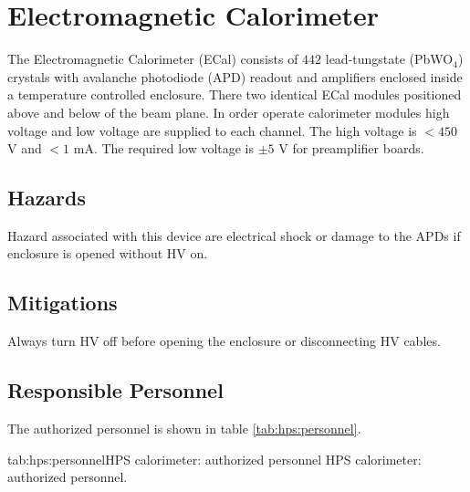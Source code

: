 \section{Electromagnetic Calorimeter}
\indent

The Electromagnetic Calorimeter (ECal) consists of $442$ lead-tungstate (PbWO$_4$) crystals with avalanche photodiode (APD) 
readout and amplifiers enclosed inside a temperature controlled enclosure. There two identical ECal modules positioned above and below of the beam plane. In order operate calorimeter modules high voltage and low voltage are supplied to each channel. The high voltage is $<450$ V and $<1$ mA. The required low voltage is $\pm 5$ V for preamplifier boards.   

\subsection{Hazards} 
\indent

Hazard associated with this device are electrical shock or damage to the APDs if enclosure is opened without HV on.

\subsection{Mitigations}
\indent

Always turn HV off before opening the enclosure or disconnecting HV cables.

\begin{safetyen}{10}{15}
\subsection{Responsible  Personnel} 
\end{safetyen}
The authorized personnel is shown in table \ref{tab:hps:personnel}.
\begin{namestab}{tab:hps:personnel}{HPS calorimeter: authorized personnel}{%
      HPS calorimeter: authorized personnel.}
\end{namestab}


